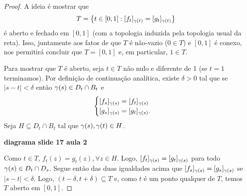     \begin{proof}
        A ideia é mostrar que
        \begin{equation*}
            T = \left\{ t\in [0,1] : [f_t]_{\gamma(t)}= [g_t]_{\gamma(t)} \right\}
        \end{equation*}
        é aberto e fechado em $[0,1]$ (com a topologia induzida pela topologia usual da reta).
        Isso, juntamente aos fatos de que $T$ é não-vazio ($0\in T$) e $[0,1]$ é conexo, 
        nos permitirá concluir que $T = [0,1]$ e, em particular, $1\in T$.
        
        Para mostrar que $T$ é aberto, seja $t\in T$ não nulo e diferente de 1 
        (se $t=1$ terminamos). Por definição de continuação analítica, existe $\delta > 0$
        tal que se $|s-t|<\delta$ então $\gamma(s) \in D_t\cap B_t$ e
        \begin{equation*}
            \begin{cases}
            [f_s]_{\gamma(s)} = [f_t]_{\gamma(s)} \\
            [g_s]_{\gamma(s)} = [g_t]_{\gamma(s)}.
            \end{cases}
        \end{equation*}
        Seja $H\subseteq D_t\cap B_t$ tal que $\gamma(s), \gamma(t)\in H$. 
        \begin{center}
            \textbf{diagrama slide 17 aula 2}
        \end{center}
        Como $t\in T$,
        $f_t(z) = g_t(z), \forall z\in H$. Logo, $[f_t]_{\gamma(s)} = [g_t]_{\gamma(s)}$
        para todo $\gamma(s)\in D_t\cap D_s$. Segue então das duas igualdades acima que
        $[f_s]_{\gamma(s)} = [g_s]_{\gamma(s)}$ se $|s-t|<\delta$. Logo, 
        $(t-\delta, t+\delta)\subseteq T$ e, como $t$ é um ponto qualquer de $T$, temos
        $T$ aberto em $[0,1]$.
        

\end{proof}

